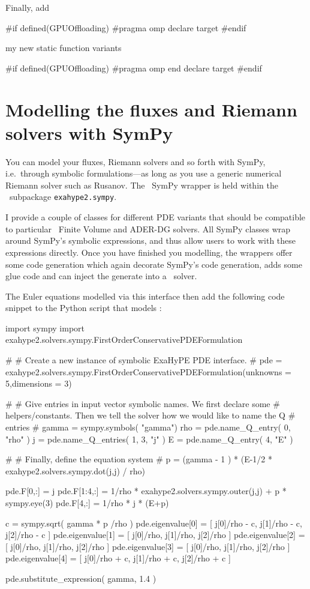 Finally, add
\begin{code}
#if defined(GPUOffloading)
#pragma omp declare target
#endif

my new static function variants

#if defined(GPUOffloading)
#pragma omp end declare target
#endif
\end{code} 






\section{Modelling the fluxes and Riemann solvers with SymPy}

You can model your fluxes, Riemann solvers and so forth with SymPy, 
i.e.~through symbolic formulations---as long as you use a generic numerical
Riemann solver such as Rusanov.
The \ExaHyPE\ SymPy wrapper is
held within the \ExaHyPE\ subpackage \texttt{exahype2.sympy}.


I provide a couple of classes for different PDE variants that should be
compatible to particular \ExaHyPE\ Finite Volume and ADER-DG solvers.
All SymPy classes wrap around SymPy's symbolic expressions, and thus allow users
to work with these expressions directly.
Once you have finished you modelling, the wrappers offer some code generation
which again decorate SymPy's code generation, adds some glue code and can inject
the generate into a \Peano\ solver.


The Euler equations modelled via this interface then add the following code
snippet to the Python script that models \Peano:

\begin{code}
import sympy
import exahype2.solvers.sympy.FirstOrderConservativePDEFormulation


#
# Create a new instance of symbolic ExaHyPE PDE interface.
#
pde = exahype2.solvers.sympy.FirstOrderConservativePDEFormulation(unknowns = 5,dimensions = 3)

#
# Give entries in input vector symbolic names. We first declare some
# helpers/constants. Then we tell the solver how we would like to name the Q 
# entries
#
gamma = sympy.symbols( "gamma")
rho   = pde.name_Q_entry( 0, "rho" )
j     = pde.name_Q_entries( 1, 3, "j" )
E     = pde.name_Q_entry( 4, "E" )

#
# Finally, define the equation system
#
p = (gamma - 1 ) * (E-1/2 * exahype2.solvers.sympy.dot(j,j) / rho)

pde.F[0,:]   = j
pde.F[1:4,:] = 1/rho * exahype2.solvers.sympy.outer(j,j) + p * sympy.eye(3)
pde.F[4,:]   = 1/rho * j * (E+p)

c = sympy.sqrt( gamma * p /rho )
pde.eigenvalue[0] = [ j[0]/rho - c, j[1]/rho - c, j[2]/rho - c ]
pde.eigenvalue[1] = [ j[0]/rho, j[1]/rho, j[2]/rho ]
pde.eigenvalue[2] = [ j[0]/rho, j[1]/rho, j[2]/rho ]
pde.eigenvalue[3] = [ j[0]/rho, j[1]/rho, j[2]/rho ]
pde.eigenvalue[4] = [ j[0]/rho + c, j[1]/rho + c, j[2]/rho + c ]

pde.substitute_expression( gamma, 1.4 )
\end{code}


